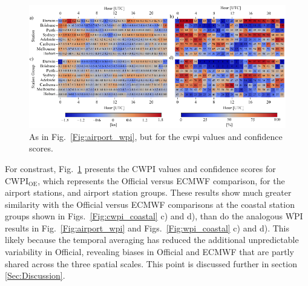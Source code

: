 \documentclass{ametsoc}
\begin{document}
\begin{figure}
\centering
\includegraphics[width=39pc]{airport_cwpi.pdf}
\caption{As in Fig.~\ref{Fig:airport_wpi}, but for the cwpi values and confidence scores.}
\label{Fig:airport_cwpi}
\end{figure}

For constrast, Fig.~\ref{Fig:airport_cwpi} presents the CWPI values and confidence scores for $\text{CWPI}_\text{OE}$, which represents the Official versus ECMWF comparison, for the airport stations, and airport station groups. These results show much greater similarity with the Official versus ECMWF comparisons at the coastal station groups shown in Figs.~\ref{Fig:cwpi_coastal} c) and d), than do the analogous $\overline{\text{WPI}}$ results in Fig.~\ref{Fig:airport_wpi} and Figs.~\ref{Fig:wpi_coastal} c) and d). This likely because the temporal averaging has reduced the additional unpredictable variability in Official, revealing biases in Official and ECMWF that are partly shared across the three spatial scales. This point is discussed further in section \ref{Sec:Discussion}. 
\end{document}
